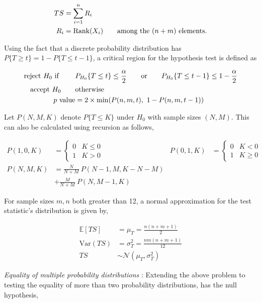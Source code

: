 \begin{align}
	TS &= \sum\limits_{i = 1}^{n} R_i \\
	R_i &= \mathrm{Rank} (X_i) \qquad \text{among the $ (n+m) $ elements.} 
\end{align}

Using the fact that a discrete probability distribution has $ P\{T \geq t\} = 1 - P\{T \leq t-1\} $, a critical region for the hypothesis test is defined as

\begin{align}
	\text{reject $ H_0 $ if } \qquad & P_{H_0}\{T \leq t\} \leq \frac{\alpha}{2} \qquad \text{or} \qquad P_{H_0}\{T \leq t - 1\} \leq 1 - \frac{\alpha}{2}  \nonumber \\
	\text{accept $ H_0 $} \qquad & \text{otherwise} \\
	p \text{ value} &= 2 \times \min(P(n,m,t),\ 1 - P(n,m,t-1))
\end{align}

Let $ P(N, M, K) $ denote $ P\{T \leq K\} $ under $ H_0 $ with sample sizes $ (N, M) $. This can also be calculated using recursion as follows,

\begin{align}
	P(1, 0, K ) &= \begin{cases}
		0 & K \leq 0 \\
		1 & K > 0
	\end{cases}
	&
	P(0, 1, K ) &= \begin{cases}
		0 & K < 0 \\
		1 & K \geq 0
	\end{cases}	\\
	P(N, M, K) &= \frac{N}{N+M}\ P(N-1, M, K-N-M) \nonumber \\
	&+ \frac{M}{N+M}\ P(N, M-1, K) 
\end{align}

For sample sizes $ m,n $ both greater than 12, a normal approximation for the test statistic's distribution is given by,

\begin{align}
	\mathbb{E}[TS] &= \mu_T = \frac{n(n+m+1)}{2} \\
	\mathrm{Var}(TS) &= \sigma^2_T = \frac{nm (n + m + 1)}{12} \\
	TS &\sim \mathcal{N}(\mu_T, \sigma^2_T)
\end{align}

\textit{Equality of multiple probability distributions} : Extending the above problem to testing the equality of more than two probability distributions, has the null hypothesis,


